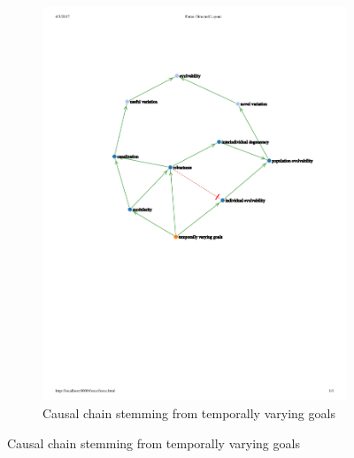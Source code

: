 \begin{figure}
\begin{subfigure}[b]{0.45\textwidth}
        \includegraphics[width=\textwidth]{img/temporally-varying-goals}
        \caption{Causal chain stemming from temporally varying goals}
        \label{subfig:mindmap_temporally-varying-goals}
    \end{subfigure}
    

\end{figure}
